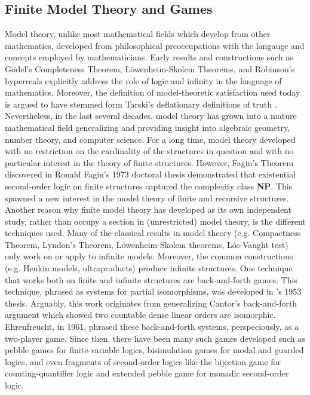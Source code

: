\subsection{Finite Model Theory and Games}
Model theory, unlike most mathematical fields which develop from other mathematics, developed from philosophical preoccupations with the langauge and concepts employed by mathematicians. Early results and constructions such as G{\"o}del's Completeness Theorem, L{\"o}wenheim-Skolem Theorems, and Robinson's hyperreals explicitly address the role of logic and infinity in the language of mathematics. Moreover, the definition of model-theoretic satisfaction used today is argued to have stemmed form Tarski's deflationary definitions of truth \cite[]{Mancosu2010}. Nevertheless, in the last several decades, model theory has grown into a mature mathematical field generalizing and providing insight into algebraic geometry,  number theory, and computer science. For a long time, model theory developed with no restriction on the cardinality of the structures in question and with no particular interest in the theory of finite structures. However, Fagin's Theorem discovered in Ronald Fagin's 1973 doctoral thesis demonstrated that existential second-order logic on finite structures captured the complexity class \textbf{NP}. This spawned a new interest in the model theory of finite and recursive structures.  Another reason why finite model theory has developed as its own independent study, rather than occupy a section in (unrestricted) model theory, is the different techniques used. Many of the classical results in model theory (e.g. Compactness Theorem, Lyndon's Theorem, L{\"o}wenheim-Skolem theorems, L{\'o}s-Vaught test) only work on or apply to infinite models. Moreover, the common constructions (e.g. Henkin models, ultraproducts) produce infinite structures. One technique that works both on finite and infinite structures are back-and-forth games. This technique, phrased as systems for partial isomorphisms, was developed in {\Fraisse}'s 1953 thesis. Arguably, this work originates from generalizing Cantor's back-and-forth argument which showed two countable dense linear orders are isomorphic. Ehrenfreucht, in 1961, phrased these back-and-forth systems, perspeciously, as a two-player game. Since then, there have been many such games developed such as pebble games \cite{Immerman1982} for finite-variable logics, bisimulation games \cite{Gradel2014} for modal and guarded logics, and even fragments of second-order logics like the bijection game \cite{Hella1996} for counting-quantifier logic and extended pebble game \cite{Libkin2004} for monadic second-order logic.
